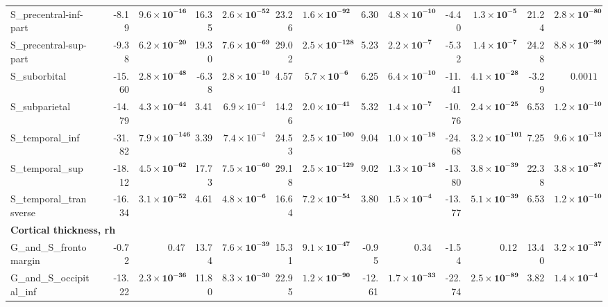 {\begin{longtable}{llrrrrrrrrrrrr}
S\_precentral-inf-part &  & -8.19 & $\mathbf{9.6{\times}10^{-16}}$ & 16.35 & $\mathbf{2.6{\times}10^{-52}}$ & 23.26 & $\mathbf{1.6{\times}10^{-92}}$ & 6.30 & $\mathbf{4.8{\times}10^{-10}}$ & -4.40 & $\mathbf{1.3{\times}10^{-5}}$ & 21.24 & $\mathbf{2.8{\times}10^{-80}}$ \\
S\_precentral-sup-part &  & -9.38 & $\mathbf{6.2{\times}10^{-20}}$ & 19.30 & $\mathbf{7.6{\times}10^{-69}}$ & 29.02 & $\mathbf{2.5{\times}10^{-128}}$ & 5.23 & $\mathbf{2.2{\times}10^{-7}}$ & -5.32 & $\mathbf{1.4{\times}10^{-7}}$ & 24.28 & $\mathbf{8.8{\times}10^{-99}}$ \\
S\_suborbital &  & -15.60 & $\mathbf{2.8{\times}10^{-48}}$ & -6.38 & $\mathbf{2.8{\times}10^{-10}}$ & 4.57 & $\mathbf{5.7{\times}10^{-6}}$ & 6.25 & $\mathbf{6.4{\times}10^{-10}}$ & -11.41 & $\mathbf{4.1{\times}10^{-28}}$ & -3.29 & $0.0011$ \\
S\_subparietal &  & -14.79 & $\mathbf{4.3{\times}10^{-44}}$ & 3.41 & $6.9{\times}10^{-4}$ & 14.26 & $\mathbf{2.0{\times}10^{-41}}$ & 5.32 & $\mathbf{1.4{\times}10^{-7}}$ & -10.76 & $\mathbf{2.4{\times}10^{-25}}$ & 6.53 & $\mathbf{1.2{\times}10^{-10}}$ \\
S\_temporal\_inf &  & -31.82 & $\mathbf{7.9{\times}10^{-146}}$ & 3.39 & $7.4{\times}10^{-4}$ & 24.53 & $\mathbf{2.5{\times}10^{-100}}$ & 9.04 & $\mathbf{1.0{\times}10^{-18}}$ & -24.68 & $\mathbf{3.2{\times}10^{-101}}$ & 7.25 & $\mathbf{9.6{\times}10^{-13}}$ \\
S\_temporal\_sup &  & -18.12 & $\mathbf{4.5{\times}10^{-62}}$ & 17.73 & $\mathbf{7.5{\times}10^{-60}}$ & 29.18 & $\mathbf{2.5{\times}10^{-129}}$ & 9.02 & $\mathbf{1.3{\times}10^{-18}}$ & -13.80 & $\mathbf{3.8{\times}10^{-39}}$ & 22.38 & $\mathbf{3.8{\times}10^{-87}}$ \\
S\_temporal\_transverse &  & -16.34 & $\mathbf{3.1{\times}10^{-52}}$ & 4.61 & $\mathbf{4.8{\times}10^{-6}}$ & 16.64 & $\mathbf{7.2{\times}10^{-54}}$ & 3.80 & $\mathbf{1.5{\times}10^{-4}}$ & -13.77 & $\mathbf{5.1{\times}10^{-39}}$ & 6.53 & $\mathbf{1.2{\times}10^{-10}}$ \\
\midrule\multicolumn{14}{l}{\textbf{Cortical thickness, rh}} \\
G\_and\_S\_frontomargin &  & -0.72 & $0.47$ & 13.74 & $\mathbf{7.6{\times}10^{-39}}$ & 15.31 & $\mathbf{9.1{\times}10^{-47}}$ & -0.95 & $0.34$ & -1.54 & $0.12$ & 13.40 & $\mathbf{3.2{\times}10^{-37}}$ \\
G\_and\_S\_occipital\_inf &  & -13.22 & $\mathbf{2.3{\times}10^{-36}}$ & 11.80 & $\mathbf{8.3{\times}10^{-30}}$ & 22.95 & $\mathbf{1.2{\times}10^{-90}}$ & -12.61 & $\mathbf{1.7{\times}10^{-33}}$ & -22.74 & $\mathbf{2.5{\times}10^{-89}}$ & 3.82 & $\mathbf{1.4{\times}10^{-4}}$ \\

\end{longtable}}
